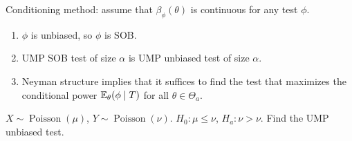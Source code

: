 Conditioning method: assume that \(\beta_\phi(\theta)\) is continuous for any test \(\phi\). 

\begin{enumerate}[(1)]

\item \(\phi\) is unbiased, so \(\phi\) is SOB.

\item UMP SOB test of size \(\alpha\) is UMP unbiased test of size \(\alpha\). 

\item Neyman structure implies that it suffices to find the test that maximizes the conditional power \(\E_\theta(\phi \mid T) \) for all \(\theta \in \Theta_a\). 

\end{enumerate}

\begin{example}

\(X \sim \operatorname{Poisson}(\mu)\), \(Y \sim \operatorname{Poisson}(\nu)\). \(H_0: \mu \leq \nu\), \(H_a: \nu > \nu\). Find the UMP unbiased test.

\end{example}

